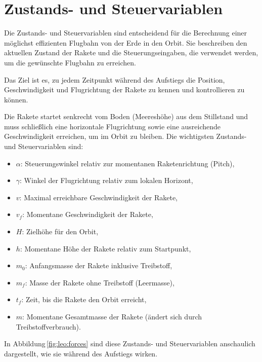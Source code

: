 %
%
%
%

\section{Zustands- und Steuervariablen \label{leo:section:variabeln}}

Die Zustands- und Steuervariablen sind entscheidend für die Berechnung einer möglichst effizienten Flugbahn von der Erde in den Orbit. 
Sie beschreiben den aktuellen Zustand der Rakete und die Steuerungseingaben, die verwendet werden, um die gewünschte Flugbahn zu erreichen. 

Das Ziel ist es, zu jedem Zeitpunkt während des Aufstiegs die Position, Geschwindigkeit und Flugrichtung der Rakete zu kennen und kontrollieren zu können. 

Die Rakete startet senkrecht vom Boden (Meereshöhe) aus dem Stillstand und muss schließlich eine horizontale Flugrichtung sowie eine ausreichende Geschwindigkeit erreichen, um im Orbit zu bleiben. 
Die wichtigsten Zustands- und Steuervariablen sind:
\begin{itemize}
	\item \(\alpha\): Steuerungswinkel relativ zur momentanen Raketenrichtung (Pitch),
	\item \(\gamma\): Winkel der Flugrichtung relativ zum lokalen Horizont,
	\item \(v\): Maximal erreichbare Geschwindigkeit der Rakete,
	\item \(v_f\): Momentane Geschwindigkeit der Rakete,
	\item \(H\): Zielhöhe für den Orbit,
	\item \(h\): Momentane Höhe der Rakete relativ zum Startpunkt,
	\item \(m_0\): Anfangsmasse der Rakete inklusive Treibstoff,
	\item \(m_f\): Masse der Rakete ohne Treibstoff (Leermasse),
	\item \(t_f\): Zeit, bis die Rakete den Orbit erreicht,
	\item \(m\): Momentane Gesamtmasse der Rakete (ändert sich durch Treibstoffverbrauch).
\end{itemize}
\noindent In Abbildung\,\ref{fig:leo:forces} sind diese Zustands- und Steuervariablen anschaulich dargestellt, wie sie während des Aufstiegs wirken.

